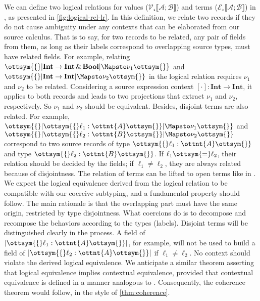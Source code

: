 We can define two logical relations for values
($\mathcal{V_r} \llbracket \mathcal{A} ; \mathcal{B} \rrbracket$) and terms
($\mathcal{E_r} \llbracket \mathcal{A}; \mathcal{B} \rrbracket$) in \lambdar, as presented
in \autoref{fig:logical-rel-lr}. In this definition, we relate two records if
they do not cause ambiguity under any contexts that can be elaborated from our
source calculus. That is to say, for two records to be related, any pair of
fields from them, as long as their labels correspond to overlapping source
types, must have related fields. For example, relating
$ \ottsym{\{}   |  \mathbf{Int}   \rightarrow   \mathbf{Int}   \, {\&} \,   \mathbf{Bool}  |   \Mapsto  \nu_{{\mathrm{1}}}  \ottsym{\}} $ and $\ottsym{\{}   |  \mathbf{Int}   \rightarrow   \mathbf{Int}  |   \Mapsto  \nu_{{\mathrm{2}}}  \ottsym{\}}$
in the logical relation requires $\nu_{{\mathrm{1}}}$ and $\nu_{{\mathrm{2}}}$ to be related.
Considering a source expression context $ [ \cdot ]:  \mathbf{Int}   \rightarrow   \mathbf{Int}  $, it applies
to both records and leads to two projections that extract $\nu_{{\mathrm{1}}}$ and
$\nu_{{\mathrm{2}}}$, respectively. So $\nu_{{\mathrm{1}}}$ and $\nu_{{\mathrm{2}}}$ should be equivalent.
Besides, disjoint terms are also related. For example,
$ \ottsym{\{}   | \ottsym{\{}  \ell_{{\mathrm{1}}}  :  \ottnt{A}  \ottsym{\}} |   \Mapsto  \nu_{{\mathrm{1}}}  \ottsym{\}} $ and $ \ottsym{\{}   | \ottsym{\{}  \ell_{{\mathrm{2}}}  :  \ottnt{B}  \ottsym{\}} |   \Mapsto  \nu_{{\mathrm{2}}}  \ottsym{\}} $ correspond
to two source records of type $ \ottsym{\{}  \ell_{{\mathrm{1}}}  :  \ottnt{A}  \ottsym{\}} $ and type $ \ottsym{\{}  \ell_{{\mathrm{2}}}  :  \ottnt{B}  \ottsym{\}} $. If
$\ell_{{\mathrm{1}}}  \ottsym{=}  \ell_{{\mathrm{2}}}$, their relation should be decided by the fields; if
$ \ell_{{\mathrm{1}}}  \neq  \ell_{{\mathrm{2}}} $, they are always related because of disjointness. The relation of
terms can be lifted to open terms like in \necolus. We expect the logical
equivalence derived from the logical relation to be compatible with our coercive
subtyping, and a fundamental property should follow. The main rationale is that
the overlapping part must have the same origin, restricted by type disjointness.
What coercions do is to decompose and recompose the behaviors according to the
types (labels). Disjoint terms will be distinguished clearly in the process. A
field of $  | \ottsym{\{}  \ell_{{\mathrm{1}}}  :  \ottnt{A}  \ottsym{\}} | $, for example, will not be used to build a field of
$  | \ottsym{\{}  \ell_{{\mathrm{2}}}  :  \ottnt{A}  \ottsym{\}} | $ if $ \ell_{{\mathrm{1}}}  \neq  \ell_{{\mathrm{2}}} $. No \lambdaiplus context should violate
the derived logical equivalence. We anticipate a similar theorem asserting that
logical equivalence implies contextual equivalence, provided that contextual
equivalence is defined in a manner analogous to \necolus. Consequently, the
coherence theorem would follow, in the style of \autoref{thm:coherence}.

